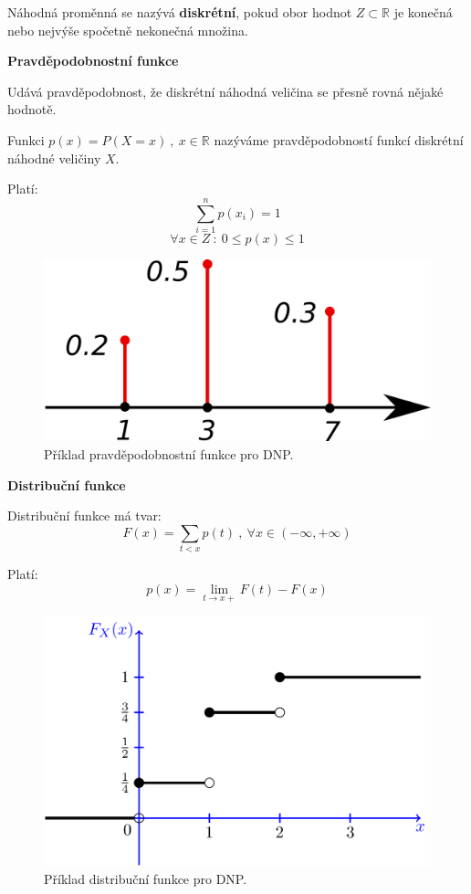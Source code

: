 \begin{compactitem}
    \item Náhodná proměnná se nazývá \textbf{diskrétní}, pokud obor hodnot $Z \subset \mathbb{R}$ je konečná nebo nejvýše spočetně nekonečná množina.

    \item \textbf{Pravděpodobnostní funkce} \begin{compactitem}
        \item Udává pravděpodobnost, že diskrétní náhodná veličina se přesně rovná nějaké hodnotě.

        \item Funkci $p(x) = P(X = x) ~,~ x \in \mathbb{R}$ nazýváme pravděpodobností funkcí diskrétní náhodné veličiny $X$.

        \item Platí:
        $$ \sum_{i=1}^n p(x_i) = 1 $$
        $$ \forall x \in Z ~:~ 0 \leq p(x) \leq 1$$
    \end{compactitem}

    \begin{figure}[H]
        \centering
        \includegraphics[width=0.5\linewidth]{dnp_pravdepodobnostni_funkce.png}
        \caption{Příklad pravděpodobnostní funkce pro DNP.}
    \end{figure}

    \item \textbf{Distribuční funkce} \begin{compactitem}
        \item Distribuční funkce má tvar:
        $$ F(x) = \sum_{t < x} p(t) ~,~ \forall x \in (-\infty, +\infty)$$

        \item Platí: 
        $$ p(x) = \lim_{t \rightarrow x+} F(t) - F(x) $$
    \end{compactitem}

    \begin{figure}[H]
        \centering
        \includegraphics[width=0.75\linewidth]{dnp_distribucni_funkce.png}
        \caption{Příklad distribuční funkce pro DNP.}
    \end{figure}


\end{compactitem}
